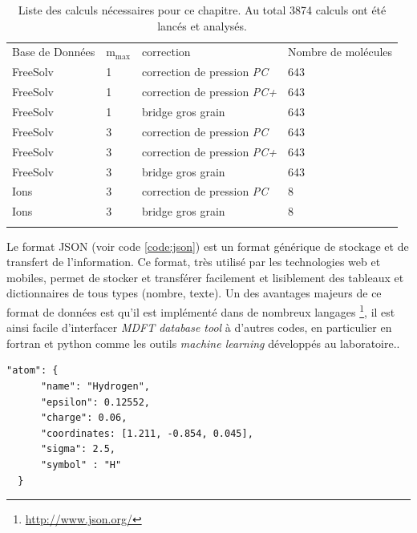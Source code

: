 \begin{table}[h]
  \begin{tabular}{ l l l l }
    \hline & \\[-1em]\hline
    Base de Données & $\mathrm{m}_\mathrm{max}$   & correction & Nombre de molécules \\
    \hline
    FreeSolv  & 1 & correction de pression \textit{PC} & 643 \\
    FreeSolv  & 1 & correction de pression \textit{PC+} & 643 \\
    FreeSolv  & 1 & bridge gros grain & 643 \\
    FreeSolv  & 3 & correction de pression \textit{PC} & 643 \\
    FreeSolv  & 3 & correction de pression \textit{PC+} & 643 \\
    FreeSolv  & 3 & bridge gros grain & 643 \\
    \hline
    Ions  & 3 & correction de pression \textit{PC} & 8 \\
    Ions  & 3 & bridge gros grain & 8 \\
    \hline & \\[-1em]\hline
  \end{tabular}
  \caption[Liste des benchmark lancés.]{Liste des calculs nécessaires pour ce chapitre. Au total 3874 calculs ont été lancés et analysés.}
  \label{tab:calculs_lances}  
\end{table}



Le format JSON (voir code \ref{code:json}) est un format générique de stockage et de transfert de l'information. Ce format, très utilisé par les technologies web et mobiles, permet de stocker et transférer facilement et lisiblement des tableaux et dictionnaires de tous types (nombre, texte). Un des avantages majeurs de ce format de données est qu'il est implémenté dans de nombreux langages \footnote{\url{http://www.json.org/}}, il est ainsi facile d'interfacer \textit{MDFT database tool} à d'autres codes, en particulier en fortran et python comme les outils \textit{machine learning} développés au laboratoire.. 


\begin{lstlisting}[caption={Exemple de fichier json. Ici on décrit un atome, son nom, son symbole, sa position ainsi que ses paramètres de champs de force.}, label={code:json},captionpos=b]
  "atom": {
      "name": "Hydrogen", 
      "epsilon": 0.12552, 
      "charge": 0.06, 
      "coordinates: [1.211, -0.854, 0.045],  
      "sigma": 2.5,
      "symbol" : "H"
  }
\end{lstlisting}





